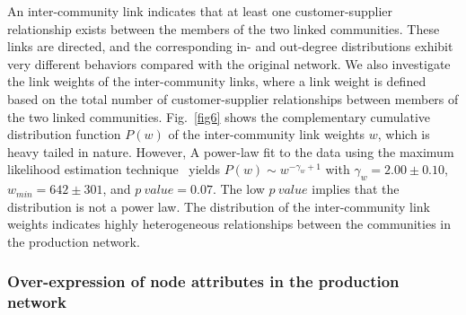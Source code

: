 \documentclass[pre,floatfix,twocolumn,showpacs,a4paper,nofootinbib]{revtex4}
\begin{document}

 

An inter-community link indicates that at least one customer-supplier relationship exists between
the members of the two linked communities. These links are directed, and the corresponding in- and out-degree distributions exhibit very different behaviors compared with the original
network. We also investigate the link weights of the inter-community links, where a link weight is defined based on the total number of customer-supplier relationships between
members of the two linked communities. Fig.~\ref{fig6} shows the complementary cumulative distribution function $P(w)$ of the inter-community link weights $w$, which is heavy tailed in nature.
However, A power-law fit to the data using the maximum likelihood estimation technique~\cite{clauset2009power} yields $P(w)\sim w^{-\gamma_w +1}$ 
with $\gamma_w =2.00 \pm 0.10$, $w_{min}=642 \pm 301$, and $p~value = 0.07$. The low $p~value$ implies that the distribution is not a power law.   
The distribution of the inter-community link weights indicates highly heterogeneous relationships between the communities in the production network.  


\subsubsection{Over-expression of node attributes in the production network}
\end{document}
